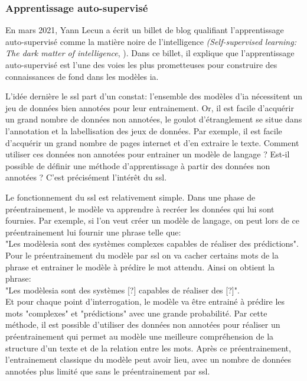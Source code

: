 \subsubsection{Apprentissage auto-supervisé}
En mars 2021, Yann Lecun a écrit un billet de blog qualifiant l'apprentissage auto-supervisé comme la matière noire de l'intelligence \textit{(Self-supervised learning: The dark matter of intelligence}, \cite{lecun_self-supervised_2021}). Dans ce billet, il explique que l'apprentissage auto-supervisé est l'une des voies les plus prometteuses pour construire des connaissances de fond dans les modèles \gls{ia}.


L'idée dernière le \gls{ssl} part d'un constat: l'ensemble des modèles d'\gls{ia} nécessitent un jeu de données bien annotées pour leur entrainement. Or, il est facile d'acquérir un grand nombre de données non annotées, le goulot d'étranglement se situe dans l'annotation et la labellisation des jeux de données. Par exemple, il est facile d'acquérir un grand nombre de pages internet et d'en extraire le texte. Comment utiliser ces données non annotées pour entrainer un modèle de langage ? Est-il possible de définir une méthode d'apprentissage à partir des données non annotées ? C'est précisément l'intérêt du \gls{ssl}.


Le fonctionnement du \gls{ssl} est relativement simple. Dans une phase de préentrainement, le modèle va apprendre à recréer les données qui lui sont fournies. Par exemple, si l'on veut créer un modèle de langage, on peut lors de ce préentrainement lui fournir une phrase telle que: \\
"Les modèles\gls{ia} sont des systèmes complexes capables de réaliser des prédictions". \\
Pour le préentrainement du modèle par \gls{ssl} on va cacher certains mots de la phrase et entrainer le modèle à prédire le mot attendu. Ainsi on obtient la phrase: \\
"Les modèles\gls{ia} sont des systèmes [?] capables de réaliser des [?]". \\
Et pour chaque point d'interrogation, le modèle va être entrainé à prédire les mots "complexes" et "prédictions" avec une grande probabilité. Par cette méthode, il est possible d'utiliser des données non annotées pour réaliser un préentrainement qui permet au modèle une meilleure compréhension de la structure d'un texte et de la relation entre les mots. Après ce préentrainement, l'entrainement classique du modèle peut avoir lieu, avec un nombre de données annotées plus limité que sans le préentrainement par \gls{ssl}.


